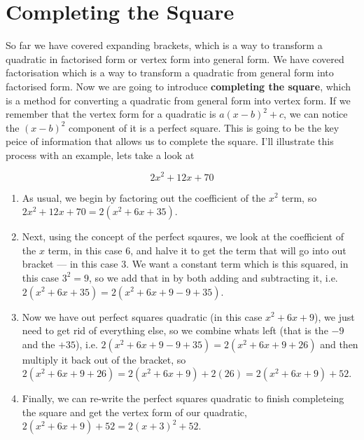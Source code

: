 \documentclass[12pt]{article}
\begin{document}
\vspace{0.2cm}\vspace{0.2cm}



\pagebreak
\section*{Completing the Square}

So far we have covered expanding brackets, which is a way to transform a quadratic in factorised form or vertex form into general form. We have covered factorisation which is a way to transform a quadratic from general form into factorised form. Now we are going to introduce \textbf{completing the square}, which is a method for converting a quadratic from general form into vertex form. If we remember that the vertex form for a quadratic is $a(x-b)^2 + c$, we can notice the $(x-b)^2$ component of it is a perfect square. This is going to be the key peice of information that allows us to complete the square. I'll illustrate this process with an example, lets take a look at 

\begin{equation*}
  2x^2 + 12x + 70
\end{equation*}

\begin{enumerate}
  \item As usual, we begin by factoring out the coefficient of the $x^2$ term, so $2x^2 + 12x + 70 = 2(x^2 + 6x + 35)$.
  \item Next, using the concept of the perfect sqaures, we look at the coefficient of the $x$ term, in this case $6$, and halve it to get the term that will go into out bracket --- in this case $3$. We want a constant term which is this squared, in this case $3^2 = 9$, so we add that in by both adding and subtracting it, i.e. $2(x^2 + 6x + 35) = 2(x^2 + 6x + 9 - 9 + 35)$.
  \item Now we have out perfect squares quadratic (in this case $x^2 + 6x + 9$), we just need to get rid of everything else, so we combine whats left (that is the $-9$ and the $+35$), i.e. $2(x^2 + 6x + 9 - 9 + 35) = 2(x^2 + 6x + 9 +26)$ and then multiply it back out of the bracket, so $2(x^2 + 6x + 9 + 26) = 2(x^2 + 6x + 9) + 2(26) = 2(x^2 + 6x + 9) + 52$.
  \item Finally, we can re-write the perfect squares quadratic to finish completeing the square and get the vertex form of our quadratic, $2(x^2 + 6x + 9) + 52 = 2(x + 3)^2 + 52$.
\end{enumerate}
\end{document}
